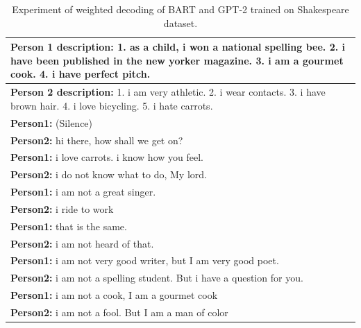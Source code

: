 \begin{table}[ht]
\centering
 \begin{tabular}{|p{14cm}|} 
 \hline
 \textbf{Person 1 description:} 1. as a child, i won a national spelling bee. 2. i have been published in the new yorker magazine. 3. i am a gourmet cook. 4. i have perfect pitch. \\
 \hline
 \textbf{Person 2 description:} 1. i am very athletic. 2. i wear contacts. 3. i have brown hair. 4. i love bicycling. 5. i hate carrots. \\
 \hline
 \textbf{Person1:} (Silence) \\
 \textbf{Person2:} hi there, how shall we get on?  \\ 
 \textbf{Person1:} i love carrots. i know how you feel. \\
 \textbf{Person2:} i do not know what to do, My lord. \\
 \textbf{Person1:} i am not a great singer. \\
 \textbf{Person2:} i ride to work \\
 \textbf{Person1:} that is the same. \\
 \textbf{Person2:} i am not heard of that. \\
 \textbf{Person1:} i am not very good writer, but I am very good poet. \\
 \textbf{Person2:} i am not a spelling student. But i have a question for you. \\
 \textbf{Person1:} i am not a cook, I am a gourmet cook \\
 \textbf{Person2:} i am not a fool. But I am a man of color  \\
 \hline
 \end{tabular}
 \caption{Experiment of weighted decoding of BART and GPT-2 trained on Shakespeare dataset.}
\label{tab:poetic_shakespear}
\end{table}

